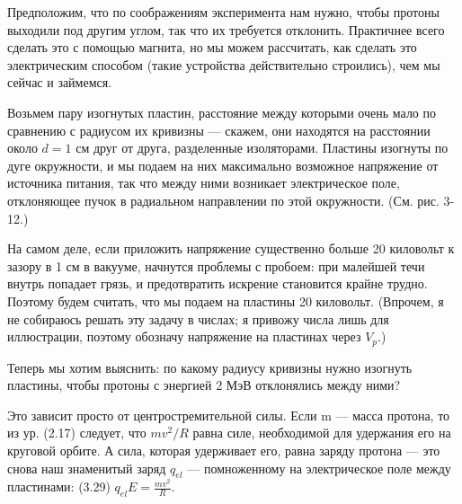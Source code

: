 \documentclass[10pt,oneside]{article}
\begin{document}
Предположим, что по соображениям эксперимента нам нужно, чтобы протоны выходили под другим углом, так что их требуется отклонить. Практичнее всего сделать это с помощью магнита, но мы можем рассчитать, как сделать это электрическим способом (такие устройства действительно строились), чем мы сейчас и займемся.\par

Возьмем пару изогнутых пластин, расстояние между которыми очень мало по сравнению с радиусом их кривизны --- скажем, они находятся на расстоянии около \(d = 1\) см друг от друга, разделенные изоляторами. Пластины изогнуты по дуге окружности, и мы подаем на них максимально возможное напряжение от источника питания, так что между ними возникает электрическое поле, отклоняющее пучок в радиальном направлении по этой окружности. (См. рис. 3-12.)\par

На самом деле, если приложить напряжение существенно больше 20 киловольт к зазору в 1 см в вакууме, начнутся проблемы с пробоем: при малейшей течи внутрь попадает грязь, и предотвратить искрение становится крайне трудно. Поэтому будем считать, что мы подаем на пластины 20 киловольт. (Впрочем, я не собираюсь решать эту задачу в числах; я привожу числа лишь для иллюстрации, поэтому обозначу напряжение на пластинах через \(V_p\).)\par

Теперь мы хотим выяснить: по какому радиусу кривизны нужно изогнуть пластины, чтобы протоны с энергией 2 МэВ отклонялись между ними?\par

Это зависит просто от центростремительной силы. Если m --- масса протона, то из ур. (2.17) следует, что \(m v^2 / R\) равна силе, необходимой для удержания его на круговой орбите. А сила, которая удерживает его, равна заряду протона --- это снова наш знаменитый заряд \(q_{el}\) --- помноженному на электрическое поле между пластинами: (3.29) \(q_{el} E = \frac{m v^2}{R}.\)\par
\end{document}
